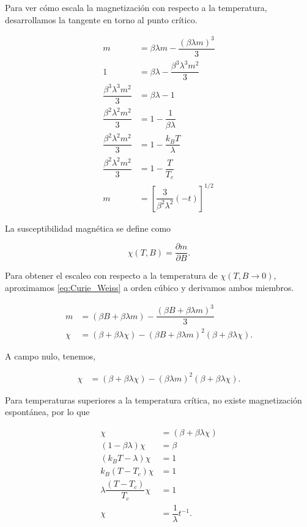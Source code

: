 \documentclass[10pt]{article}
\begin{document}
Para ver c\'omo escala la magnetizaci\'on con respecto a la temperatura, desarrollamos la tangente en torno al punto cr\'itico.

\begin{align}
m &= \beta \lambda m - \dfrac{(\beta \lambda m)^3}{3} \nonumber \\
1 &= \beta \lambda - \dfrac{\beta^3 \lambda^3 m^2}{3}\nonumber \\
\dfrac{\beta^3 \lambda^3 m^2}{3} &= \beta \lambda - 1\nonumber \\
\dfrac{\beta^2 \lambda^2 m^2}{3} &= 1- \dfrac{1}{\beta \lambda}\nonumber \\
\dfrac{\beta^2 \lambda^2 m^2}{3} &= 1- \dfrac{k_B T}{ \lambda} \nonumber\\
\dfrac{\beta^2 \lambda^2 m^2}{3} &= 1- \dfrac{T}{ T_c}\nonumber \\
m &= \left[\dfrac{3}{\beta^2 \lambda^2} (-t)\right]^{1/2} \label{eq:m_function_t}
\end{align}

La susceptibilidad magn\'etica se define como 

\begin{equation}
\chi(T, B) = \dfrac{\partial m}{\partial B}.
\end{equation}

Para obtener el escaleo con respecto a la temperatura de $\chi(T, B\rightarrow 0)$, aproximamos \ref{eq:Curie_Weiss} a orden c\'ubico y derivamos ambos miembros.

\begin{align}
m &= (\beta B + \beta \lambda m) - \dfrac{(\beta B + \beta \lambda m)^3}{3} \nonumber \\
\chi &= (\beta + \beta \lambda \chi) - (\beta B + \beta \lambda m)^2 (\beta + \beta \lambda \chi). 
\end{align}

A campo nulo, tenemos,

\begin{align}
\chi &= (\beta + \beta \lambda \chi) - (\beta \lambda m)^2 (\beta + \beta \lambda \chi). 
\end{align}

Para temperaturas superiores a la temperatura cr\'itica, no existe magnetizaci\'on espont\'anea, por lo que 

\begin{align}
\chi &= (\beta + \beta \lambda \chi) \nonumber \\
(1 - \beta \lambda )\chi &= \beta  \nonumber  \\
(k_B T - \lambda )\chi &= 1  \nonumber  \\
k_B (T -T_c )\chi &= 1 \nonumber   \\
\lambda \dfrac{(T -T_c )}{T_c}\chi &= 1  \nonumber  \\
\chi &= \dfrac{1}{\lambda} t^{-1}.
\end{align}
\end{document}
